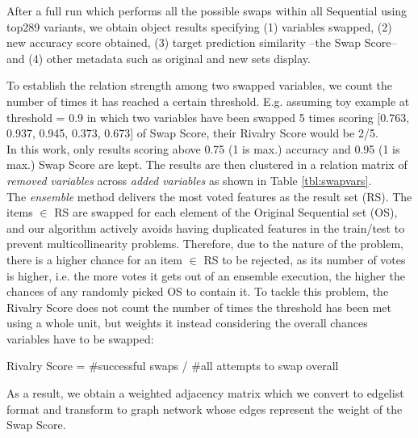 After a full run which performs all the possible swaps within all Sequential using top289 variants, we obtain object results specifying (1) variables swapped, (2) new accuracy score obtained, (3) target prediction similarity --the Swap Score-- and (4) other metadata such as original and new sets display.

To establish the relation strength among two swapped variables, we count the number of times it has reached a certain threshold. E.g. assuming toy example at threshold = 0.9 in which two variables have been swapped 5 times scoring [0.763, 0.937, 0.945, 0.373, 0.673] of Swap Score, their Rivalry Score would be 2/5.
\\

In this work, only results scoring above 0.75 (1 is max.) accuracy and 0.95 (1 is max.) Swap Score are kept. The results are then clustered in a relation matrix of \textit{removed variables} across \textit{added variables} as shown in Table \ref{tbl:swapvars}. 
\\

The \emph{ensemble} method delivers the most voted features as the result set (RS). The items $\in$ RS are swapped for each element of the Original Sequential set (OS), and our algorithm actively avoids having duplicated features in the train/test to prevent multicollinearity problems. Therefore, due to the nature of the problem, there is a higher chance for an item $\in$ RS to be rejected, as its number of votes is higher, i.e. the more votes it gets out of an ensemble execution, the higher the chances of any randomly picked OS to contain it. To tackle this problem, the Rivalry Score does not count the number of times the threshold has been met using a whole unit, but weights it instead considering the overall chances variables have to be swapped:

\begin{center}
    Rivalry Score = \#successful swaps / \#all attempts to swap overall
\end{center}

As a result, we obtain a weighted adjacency matrix which we convert to edgelist format and transform to graph network whose edges represent the weight of the Swap Score.
\\


